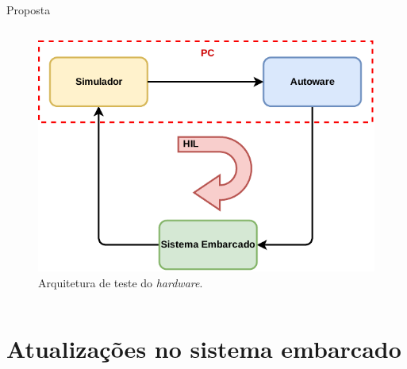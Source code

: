 \documentclass{if-beamer}
\begin{document}
\begin{frame}{Proposta}
\begin{columns}
\begin{column}{0.45\textwidth}
				\begin{figure}[H]
				\centering
				\includegraphics[width=\linewidth]{img/architecture_HIL}
				\caption{Arquitetura de teste do \textit{hardware}.}
				\label{fig:architecture_HIL}
			\end{figure}
			
		\end{column}
		
	\end{columns}
	
\end{frame}

\section[Sistema embarcado]{Atualizações no sistema embarcado}
\end{document}
